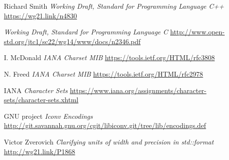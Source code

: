 \documentclass{wg21}
\begin{document}
\begin{thebibliography}{9}

Richard Smith
\emph{Working Draft, Standard for Programming Language C++}\newline
\url{https://wg21.link/n4830}


\emph{Working Draft, Standard for Programming Language C}\newline
\url{ http://www.open-std.org/jtc1/sc22/wg14/www/docs/n2346.pdf}


I. McDonald
\emph{IANA Charset MIB}\newline
\url{https://tools.ietf.org/HTML/rfc3808}

N. Freed
\emph{IANA Charset MIB}\newline
\url{https://tools.ietf.org/HTML/rfc2978}

IANA
\emph{Character Sets}\newline
\url{https://www.iana.org/assignments/character-sets/character-sets.xhtml}


GNU project
\emph{Iconv Encodings}\newline
\url{http://git.savannah.gnu.org/cgit/libiconv.git/tree/lib/encodings.def}

Victor Zverovich
\emph{Clarifying units of width and precision in std::format}\newline
\url{http://wg21.link/P1868}


\end{thebibliography}
\end{document}
